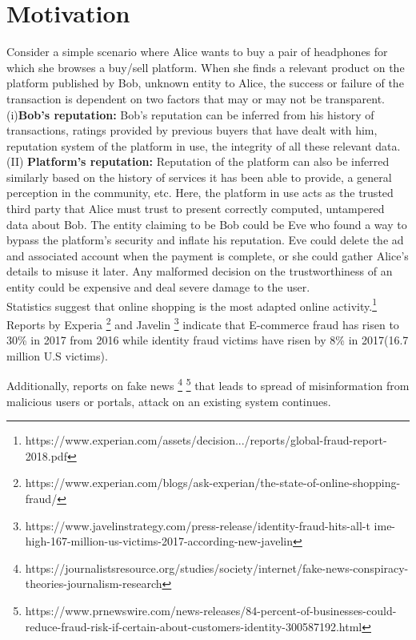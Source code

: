 \section{Motivation}
Consider a simple scenario where Alice wants to buy a pair of headphones for
which she browses a buy/sell platform. When she finds a relevant product on the
platform published by Bob, unknown entity to Alice, the success or failure of
the transaction is dependent on two factors that may or may not be transparent.\\
(i)\textbf{Bob's reputation:} Bob's reputation can be inferred from his history of
transactions, ratings provided by previous buyers that have dealt with him,
reputation system of the platform in use, the integrity of all these relevant
data. \\
(II) \textbf{Platform's reputation:} Reputation of the platform can also be inferred
similarly based on the history of services it has been able to provide, a
general perception in the community, etc. 
Here, the platform in use acts as the trusted third party that Alice must trust
to present correctly computed, untampered data about Bob. The entity claiming
to be Bob could be Eve who found a way to bypass the platform's security and
inflate his reputation. Eve could delete the ad and associated account when the
payment is complete, or she could gather Alice's details to misuse it later.
Any malformed decision on the trustworthiness of an entity could be expensive
and deal severe damage to the user.\\ 
Statistics suggest that online shopping is the most adapted online
activity.\footnote{https://www.experian.com/assets/decision.../reports/global-fraud-report-2018.pdf}
Reports by Experia
\footnote{https://www.experian.com/blogs/ask-experian/the-state-of-online-shopping-fraud/}
and Javelin
\footnote{https://www.javelinstrategy.com/press-release/identity-fraud-hits-all-t
ime-high-167-million-us-victims-2017-according-new-javelin} indicate that
E-commerce fraud has risen to 30\% in 2017 from 2016 while identity fraud
victims have risen by 8\% in 2017(16.7 million U.S victims). 

Additionally, reports on fake news
\footnote{https://journalistsresource.org/studies/society/internet/fake-news-conspiracy-theories-journalism-research}
\footnote{https://www.prnewswire.com/news-releases/84-percent-of-businesses-could-reduce-fraud-risk-if-certain-about-customers-identity-300587192.html}
that leads to spread of misinformation from malicious users or portals, attack
on an existing system continues.

